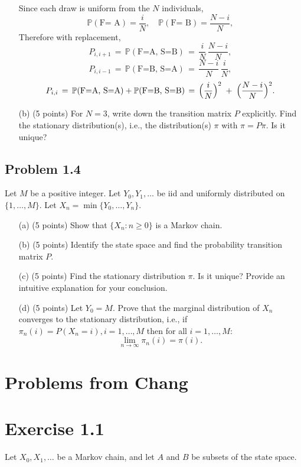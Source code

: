 \documentclass{article}
\begin{document}
\begin{enumerate}
{Since each draw is uniform from the $N$ individuals,
\[
\mathbb{P}(\text{F= A}) = \frac{i}{N}, 
\quad
\mathbb{P}(\text{F= B}) = \frac{N-i}{N},
\]
Therefore with replacement,
\[
P_{i,i+1} 
\,=\, \mathbb{P}(\text{F=A, S=B})
\,=\, \frac{i}{N}\,\frac{N-i}{N},
\]
\[
P_{i,i-1} 
\,=\, \mathbb{P}(\text{F=B, S=A})
\,=\, \frac{N-i}{N}\,\frac{i}{N},
\]
\[
P_{i,i} 
\,=\, \mathbb{P}(\text{F=A, S=A}) + \mathbb{P}(\text{F=B, S=B})
\,=\, \Bigl(\frac{i}{N}\Bigr)^2 \;+\; \Bigl(\frac{N-i}{N}\Bigr)^2.
\]
}
    \item[(b)] (5 points) For $N = 3$, write down the transition matrix $P$ explicitly. Find the stationary distribution(s), i.e., the distribution(s) $\pi$ with $\pi = P \pi$. Is it unique?
\end{enumerate}

\subsection*{Problem 1.4}
Let $M$ be a positive integer. Let $Y_0, Y_1, \ldots$ be iid and uniformly distributed on $\{1, \ldots, M\}$. Let $X_n = \min\{Y_0, \ldots, Y_n\}$.

\begin{enumerate}
    \item[(a)] (5 points) Show that $\{X_n : n \geq 0\}$ is a Markov chain.
    \item[(b)] (5 points) Identify the state space and find the probability transition matrix $P$.
    \item[(c)] (5 points) Find the stationary distribution $\pi$. Is it unique? Provide an intuitive explanation for your conclusion.
    \item[(d)] (5 points) Let $Y_0 = M$. Prove that the marginal distribution of $X_n$ converges to the stationary distribution, i.e., if $\pi_n(i) = P(X_n = i), i = 1, \ldots, M$ then for all $i = 1, \ldots, M$:
    \[
    \lim_{n \to \infty} \pi_n(i) = \pi(i).
    \]
\end{enumerate}

\section*{Problems from Chang}

\section*{Exercise 1.1}
Let $X_0, X_1, \ldots$ be a Markov chain, and let $A$ and $B$ be subsets of the state space.
\end{document}
